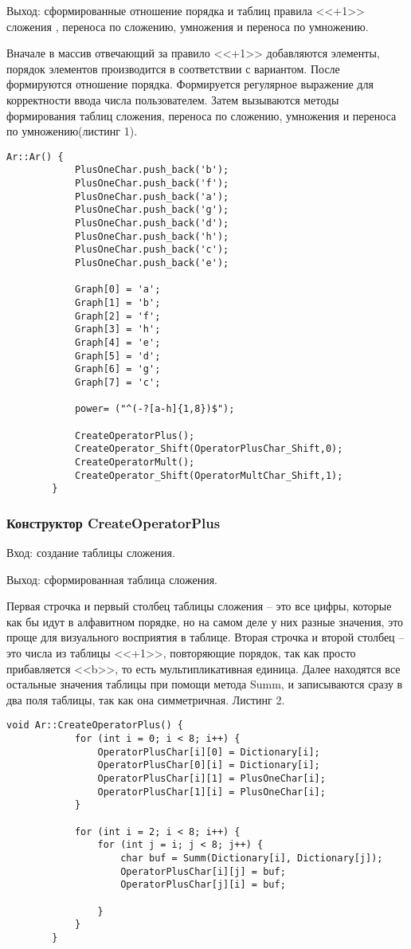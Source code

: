 \documentclass[10pt,a4paper,final]{article} %
\begin{document}
	Выход: сформированные отношение порядка и таблиц правила <<+1>> сложения , переноса по сложению, умножения и переноса по умножению.
	
	Вначале в массив отвечающий за правило <<+1>> добавляются элементы, порядок элементов производится в соответствии с вариантом. После формируются отношение порядка. Формируется регулярное выражение для корректности ввода числа пользователем. Затем вызываются методы формирования таблиц сложения, переноса по сложению, умножения и переноса по умножению(листинг 1).
	
	\begin{lstlisting}[caption={Конструктор Ar}]
		Ar::Ar() {
			PlusOneChar.push_back('b');
			PlusOneChar.push_back('f');
			PlusOneChar.push_back('a');
			PlusOneChar.push_back('g');
			PlusOneChar.push_back('d');
			PlusOneChar.push_back('h');
			PlusOneChar.push_back('c');
			PlusOneChar.push_back('e');

			Graph[0] = 'a';
			Graph[1] = 'b';
			Graph[2] = 'f';
			Graph[3] = 'h';
			Graph[4] = 'e';
			Graph[5] = 'd';
			Graph[6] = 'g';
			Graph[7] = 'c';
			
			power= ("^(-?[a-h]{1,8})$");
			
			CreateOperatorPlus();
			CreateOperator_Shift(OperatorPlusChar_Shift,0);
			CreateOperatorMult();
			CreateOperator_Shift(OperatorMultChar_Shift,1);
		}
	\end{lstlisting}
	
		\subsubsection{Конструктор CreateOperatorPlus}
	Вход: создание таблицы сложения.
	
	Выход: сформированная таблица сложения.
	
	Первая строчка и первый столбец таблицы сложения -- это все цифры, которые как бы идут в алфавитном порядке, но на самом деле у них разные значения, это проще для визуального восприятия в таблице. Вторая строчка и второй столбец -- это числа из таблицы <<+1>>, повторяющие порядок, так как просто прибавляется <<b>>, то есть мультипликативная единица. Далее находятся все остальные значения таблицы при помощи метода Summ, и записываются сразу в два поля таблицы, так как она симметричная. Листинг 2.
	
	\begin{lstlisting}[caption={Конструктор CreateOperatorPlus}]
		void Ar::CreateOperatorPlus() {
			for (int i = 0; i < 8; i++) {
				OperatorPlusChar[i][0] = Dictionary[i];
				OperatorPlusChar[0][i] = Dictionary[i];
				OperatorPlusChar[i][1] = PlusOneChar[i];
				OperatorPlusChar[1][i] = PlusOneChar[i];
			}
			
			for (int i = 2; i < 8; i++) {
				for (int j = i; j < 8; j++) {
					char buf = Summ(Dictionary[i], Dictionary[j]);
					OperatorPlusChar[i][j] = buf;
					OperatorPlusChar[j][i] = buf;
					
				}
			}
		}
	\end{lstlisting}
	
\end{document}

